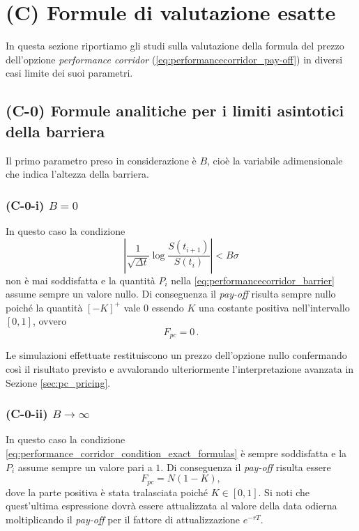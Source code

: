 \chapter{(C) Formule di valutazione esatte} \label{cap:exactformulas}

In questa sezione riportiamo gli studi sulla valutazione della formula del prezzo dell'opzione \textit{performance corridor} (\ref{eq:performancecorridor_pay-off}) in diversi casi limite dei suoi parametri. 

\section{(C-0) Formule analitiche per i limiti asintotici della barriera}

Il primo parametro preso in considerazione è $B$, cioè la variabile adimensionale che indica l'altezza della barriera.

\subsection{(C-0-i) \texorpdfstring{$B=0$}{B=0}}

In questo caso la condizione
\begin{equation}
\left| \frac{1}{\sqrt{\Delta t}} \log{\frac{S(t_{i+1})}{S(t_i)}} \right| < B\sigma  
\label{eq:performance_corridor_condition_exact_formulas}
\end{equation}
non è mai soddisfatta e la quantità $P_{i}$ nella \eqref{eq:performancecorridor_barrier} assume sempre un valore nullo. Di conseguenza il \textit{pay-off} risulta sempre nullo poiché la quantità $[-K]^{+}$ vale $0$ essendo $K$ una costante positiva nell'intervallo $[0,1]$, ovvero
\begin{equation}
    F_{pc} = 0 \,.
\end{equation}

Le simulazioni effettuate restituiscono un prezzo dell'opzione nullo confermando così il risultato previsto e avvalorando ulteriormente l'interpretazione avanzata in Sezione \ref{sec:pc_pricing}.

\subsection{(C-0-ii) \texorpdfstring{$B\rightarrow \infty$}{B->infinity}}

In questo caso la condizione \eqref{eq:performance_corridor_condition_exact_formulas} è sempre soddisfatta e la $P_{i}$ assume sempre un valore pari a $1$. Di conseguenza il \textit{pay-off} risulta essere
\begin{equation}
    F_{pc}=N(1-K),
\end{equation}
dove la parte positiva è stata tralasciata poiché $K \in [0,1]$. Si noti che quest'ultima espressione dovrà essere attualizzata al valore della data odierna moltiplicando il \textit{pay-off} per il fattore di attualizzazione $e^{-r T}$.

